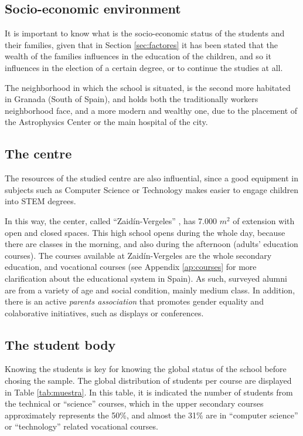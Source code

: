 \documentclass[journal,transmag]{IEEEtran}
\begin{document}
\subsection{Socio-economic environment}

It is important to know what is the socio-economic status of the students and their families, given that in Section \ref{sec:factores} it has been stated that the wealth of the families influences in the education of the children, and so it influences in the election of a certain degree, or to continue the studies at all.

The neighborhood in which the school is situated, is the second more habitated in Granada (South of Spain), and holds both the traditionally workers neighborhood face, and a more modern and wealthy one, due to the placement of the Astrophysics Center or the main hospital of the city.

\subsection{The centre}

The resources of the studied centre are also influential, since a good equipment in subjects such as Computer Science or Technology makes easier to engage children into STEM degrees.

In this way, the center, called ``Zaid\'{i}n-Vergeles'' \cite{iesZV:2013}, has 7.000 $m^2$ of extension with open and closed spaces. This high school opens during the whole day, because there are classes in the morning, and also during the afternoon (adults' education courses). The courses available at Zaid\'{i}n-Vergeles are the whole secondary education, and vocational courses (see Appendix \ref{ap:courses} for more clarification about the educational system in Spain). As such, surveyed alumni are from a variety of age and social condition, mainly medium class. In addition, there is an active \textit{parents association} that promotes gender equality and colaborative initiatives, such as displays or conferences.

\subsection{The student body}

Knowing the students is key for knowing the global status of the school before chosing the sample. The global distribution of students per course are displayed in Table \ref{tab:muestra}. In this table, it is indicated the number of students from the technical or ``science'' courses, which in the upper secondary courses approximately represents the 50\%, and almost the 31\% are in ``computer science'' or ``technology'' related vocational courses.
\end{document}
